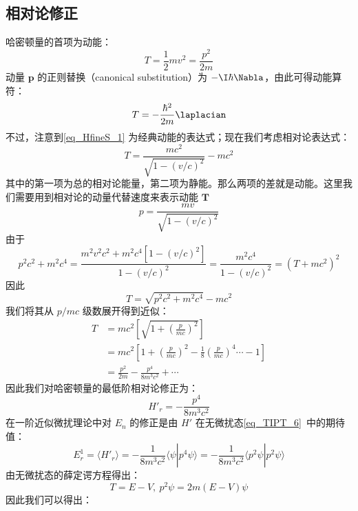 \subsection{相对论修正}
哈密顿量的首项为动能：
\begin{equation}\label{eq_HfineS_1}
T=\frac{1}{2}mv^2=\frac{p^2}{2m}
\end{equation}
动量 $\mathbf p$ 的正则替换（canonical substitution）为 $-\I\hbar\Nabla$，由此可得动能算符：
\begin{equation}
T=-\frac{\hbar^2}{2m}\laplacian
\end{equation}
不过，注意到\autoref{eq_HfineS_1} 为经典动能的表达式；现在我们考虑相对论表达式：
\begin{equation}
T=\frac{mc^2}{\sqrt{1-(v/c)^2}}-mc^2
\end{equation}
其中的第一项为总的相对论能量，第二项为静能。那么两项的差就是动能。这里我们需要用到相对论的动量代替速度来表示动能 $\mathbf T$
\begin{equation}
p=\frac{mv}{\sqrt{1-(v/c)^2}}
\end{equation}
由于
\begin{equation}
p^2c^2+m^2c^4=\frac{m^2v^2c^2+m^2c^4[1-(v/c)^2]}{1-(v/c)^2}=\frac{m^2c^4}{1-(v/c)^2}=(T+mc^2)^2
\end{equation}
因此
\begin{equation}
T=\sqrt{p^2c^2+m^2c^4}-mc^2
\end{equation}
我们将其从 $p/mc$ 级数展开得到近似：
\begin{align}
T &= mc^2\left[\sqrt{1+\left(\frac{p}{mc}\right)^2}\right]\\ 
&=mc^2\left[1+\left(\frac{p}{mc}\right)^2-\frac{1}{8}\left(\frac{p}{mc}\right)^4\cdots -1\right]\\
&=\frac{p^2}{2m}-\frac{p^4}{8m^3c^2}+\cdots
\end{align}
因此我们对哈密顿量的最低阶相对论修正为：
\begin{equation}
H'_r=-\frac{p^4}{8m^3c^2}
\end{equation}
在一阶近似微扰理论中对 $E_n$ 的修正是由 $H'$ 在无微扰态\autoref{eq_TIPT_6}~中的期待值：
\begin{equation}\label{eq_HfineS_16}
E_r^1=\langle H'_r\rangle=-\frac{1}{8m^3c^2}\langle\psi|p^4\psi\rangle=-\frac{1}{8m^3c^2}\langle p^2\psi|p^2\psi\rangle
\end{equation}
由无微扰态的薛定谔方程得出：
\begin{equation}
T=E-V, \ p^2\psi = 2m(E-V)\psi
\end{equation}
因此我们可以得出：
